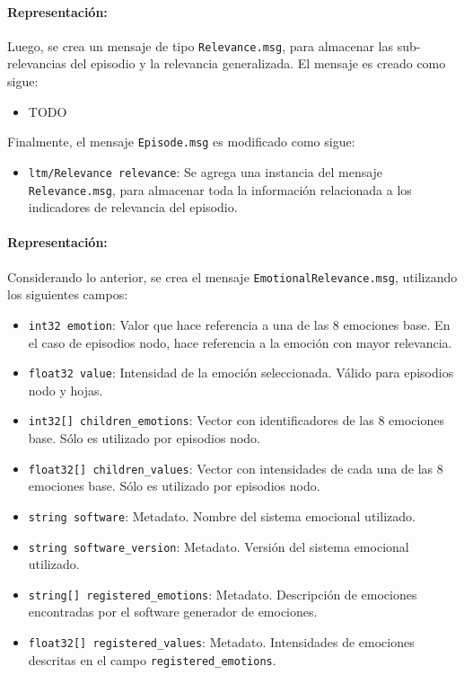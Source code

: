\paragraph{Representación:}
Luego, se crea un mensaje de tipo \texttt{Relevance.msg}, para almacenar las sub-relevancias del episodio y la relevancia generalizada. El mensaje es creado como sigue:
\begin{itemize}
	\item TODO
\end{itemize}


Finalmente, el mensaje \texttt{Episode.msg} es modificado como sigue:
\begin{itemize}
	\item \texttt{ltm/Relevance relevance}: Se agrega una instancia del mensaje \texttt{Relevance.msg}, para almacenar toda la información relacionada a los indicadores de relevancia del episodio.
\end{itemize}

\paragraph{Representación:}
Considerando lo anterior, se crea el mensaje \texttt{EmotionalRelevance.msg}, utilizando los siguientes campos:
\begin{itemize}
	\item \texttt{int32 emotion}: Valor que hace referencia a una de las 8 emociones base. En el caso de episodios nodo, hace referencia a la emoción con mayor relevancia.
	\item \texttt{float32 value}: Intensidad de la emoción seleccionada. Válido para episodios nodo y hojas.
	\item \texttt{int32[] children\_emotions}: Vector con identificadores de las 8 emociones base. Sólo es utilizado por episodios nodo.
	\item \texttt{float32[] children\_values}: Vector con intensidades de cada una de las 8 emociones base. Sólo es utilizado por episodios nodo.
	\item \texttt{string software}: Metadato. Nombre del sistema emocional utilizado.
	\item \texttt{string software\_version}: Metadato. Versión del sistema emocional utilizado.
	\item \texttt{string[] registered\_emotions}: Metadato. Descripción de emociones encontradas por el software generador de emociones. 
	\item \texttt{float32[] registered\_values}: Metadato. Intensidades de emociones descritas en el campo \texttt{registered\_emotions}.
\end{itemize}


